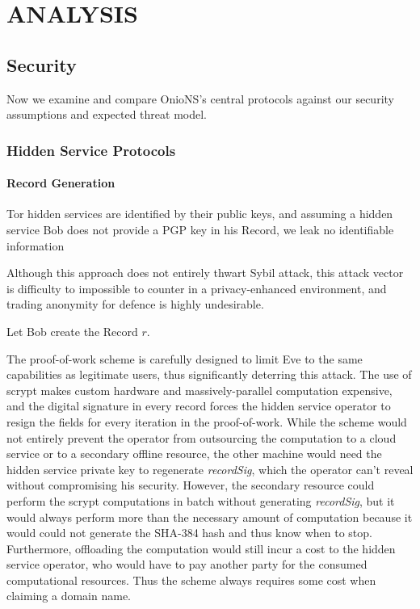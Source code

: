
\chapter{ANALYSIS}
\label{Chapter:Analysis}

\section{Security}

Now we examine and compare OnioNS's central protocols against our security assumptions and expected threat model.

\subsection{Hidden Service Protocols}

\subsubsection{Record Generation}

Tor hidden services are identified by their public keys, and assuming a hidden service Bob does not provide a PGP key in his Record, we leak no identifiable information 

 Although this approach does not entirely thwart Sybil attack, this attack vector is difficulty to impossible to counter in a privacy-enhanced environment, and trading anonymity for defence is highly undesirable.

Let Bob create the Record $ r $.

The proof-of-work scheme is carefully designed to limit Eve to the same capabilities as legitimate users, thus significantly deterring this attack. The use of scrypt makes custom hardware and massively-parallel computation expensive, and the digital signature in every record forces the hidden service operator to resign the fields for every iteration in the proof-of-work. While the scheme would not entirely prevent the operator from outsourcing the computation to a cloud service or to a secondary offline resource, the other machine would need the hidden service private key to regenerate \emph{recordSig}, which the operator can't reveal without compromising his security. However, the secondary resource could perform the scrypt computations in batch without generating \emph{recordSig}, but it would always perform more than the necessary amount of computation because it would could not generate the SHA-384 hash and thus know when to stop. Furthermore, offloading the computation would still incur a cost to the hidden service operator, who would have to pay another party for the consumed computational resources. Thus the scheme always requires some cost when claiming a domain name.

